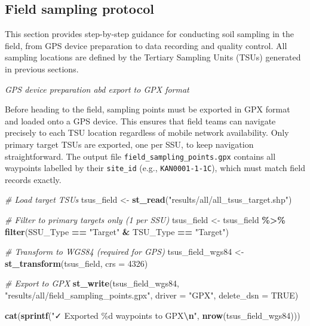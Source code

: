 \documentclass[
  10pt,
  b5paper,
  oneside]{book}
\newenvironment{Shaded}{\begin{snugshade}}{\end{snugshade}}
\newcommand{\AttributeTok}[1]{\textcolor[rgb]{0.13,0.29,0.53}{#1}}
\newcommand{\CommentTok}[1]{\textcolor[rgb]{0.56,0.35,0.01}{\textit{#1}}}
\newcommand{\ConstantTok}[1]{\textcolor[rgb]{0.56,0.35,0.01}{#1}}
\newcommand{\DecValTok}[1]{\textcolor[rgb]{0.00,0.00,0.81}{#1}}
\newcommand{\FunctionTok}[1]{\textcolor[rgb]{0.13,0.29,0.53}{\textbf{#1}}}
\newcommand{\NormalTok}[1]{#1}
\newcommand{\OtherTok}[1]{\textcolor[rgb]{0.56,0.35,0.01}{#1}}
\newcommand{\SpecialCharTok}[1]{\textcolor[rgb]{0.81,0.36,0.00}{\textbf{#1}}}
\newcommand{\StringTok}[1]{\textcolor[rgb]{0.31,0.60,0.02}{#1}}
\begin{document}
\subsection{Field sampling protocol}\label{field-protocol}

This section provides step-by-step guidance for conducting soil sampling in the field, from GPS device preparation to data recording and quality control. All sampling locations are defined by the Tertiary Sampling Units (TSUs) generated in previous sections.

\emph{GPS device preparation abd export to GPX format}

Before heading to the field, sampling points must be exported in GPX format and loaded onto a GPS device. This ensures that field teams can navigate precisely to each TSU location regardless of mobile network availability. Only primary target TSUs are exported, one per SSU, to keep navigation straightforward. The output file \texttt{field\_sampling\_points.gpx} contains all waypoints labelled by their \texttt{site\_id} (e.g., \texttt{KAN0001-1-1C}), which must match field records exactly.

\begin{Shaded}
\begin{Highlighting}[]
\CommentTok{\# Load target TSUs}
\NormalTok{tsus\_field }\OtherTok{\textless{}{-}} \FunctionTok{st\_read}\NormalTok{(}\StringTok{"results/all/all\_tsus\_target.shp"}\NormalTok{)}

\CommentTok{\# Filter to primary targets only (1 per SSU)}
\NormalTok{tsus\_field }\OtherTok{\textless{}{-}}\NormalTok{ tsus\_field }\SpecialCharTok{\%\textgreater{}\%}
  \FunctionTok{filter}\NormalTok{(SSU\_Type }\SpecialCharTok{==} \StringTok{"Target"} \SpecialCharTok{\&}\NormalTok{ TSU\_Type }\SpecialCharTok{==} \StringTok{"Target"}\NormalTok{)}

\CommentTok{\# Transform to WGS84 (required for GPS)}
\NormalTok{tsus\_field\_wgs84 }\OtherTok{\textless{}{-}} \FunctionTok{st\_transform}\NormalTok{(tsus\_field, }\AttributeTok{crs =} \DecValTok{4326}\NormalTok{)}

\CommentTok{\# Export to GPX}
\FunctionTok{st\_write}\NormalTok{(tsus\_field\_wgs84, }
         \StringTok{"results/all/field\_sampling\_points.gpx"}\NormalTok{, }
         \AttributeTok{driver =} \StringTok{"GPX"}\NormalTok{, }
         \AttributeTok{delete\_dsn =} \ConstantTok{TRUE}\NormalTok{)}

\FunctionTok{cat}\NormalTok{(}\FunctionTok{sprintf}\NormalTok{(}\StringTok{"✓ Exported \%d waypoints to GPX}\SpecialCharTok{\textbackslash{}n}\StringTok{"}\NormalTok{, }\FunctionTok{nrow}\NormalTok{(tsus\_field\_wgs84)))}
\end{Highlighting}
\end{Shaded}
\end{document}
